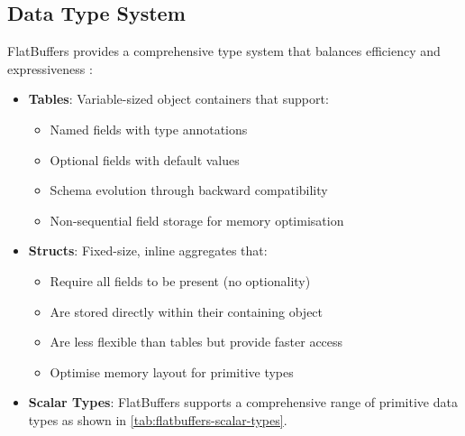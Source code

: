 \subsection{Data Type System}
\label{tb:flatbuffers:data_type_system}

FlatBuffers provides a comprehensive type system that balances efficiency and expressiveness \citep{flatbuffers_data_types}:

\begin{itemize}
  \item \textbf{Tables}: Variable-sized object containers that support:
    \begin{itemize}
      \item Named fields with type annotations
      \item Optional fields with default values
      \item Schema evolution through backward compatibility
      \item Non-sequential field storage for memory optimisation
    \end{itemize}

  \item \textbf{Structs}: Fixed-size, inline aggregates that:
    \begin{itemize}
      \item Require all fields to be present (no optionality)
      \item Are stored directly within their containing object
      \item Are less flexible than tables but provide faster access
      \item Optimise memory layout for primitive types
    \end{itemize}
  \item \textbf{Scalar Types}: FlatBuffers supports a comprehensive range of primitive data types as shown in \autoref{tab:flatbuffers-scalar-types}.


\end{itemize}
